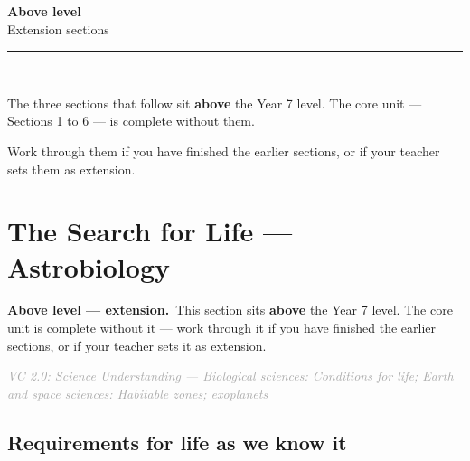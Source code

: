 \documentclass[11pt,a4paper]{article}
\newcommand{\extension}[1]{%
  \begin{extbox}
  {\headingfont\bfseries\color{Violet}Above level --- extension.}\ #1
  \end{extbox}
  \medskip
}
\newcommand{\vc}[2]{\small\textcolor{DarkGrey}{\textit{VC 2.0: #1 --- #2}}}
\begin{document}
\newpage
\vspace*{3cm}
\begin{center}
{\headingfont\Huge\bfseries\color{Violet}Above level}\\[0.4em]
{\headingfont\Large\color{Violet}Extension sections}\\[1.4em]
{\color{Violet}\rule{0.45\linewidth}{1.4pt}}\\[1.4em]
\begin{minipage}{0.72\linewidth}
\centering
The three sections that follow sit \textbf{above} the Year 7 level. The core
unit --- Sections 1 to 6 --- is complete without them.

\medskip
Work through them if you have finished the earlier sections, or if your
teacher sets them as extension.
\end{minipage}
\end{center}

\newpage
\section[The Search for Life --- Astrobiology \textnormal{(above level)}]{The Search for Life --- Astrobiology}\label{sec:8}
\extension{This section sits \textbf{above} the Year 7 level. The core unit
is complete without it --- work through it if you have finished the earlier
sections, or if your teacher sets it as extension.}
\vc{Science Understanding}{Biological sciences: Conditions for life; Earth and space sciences: Habitable zones; exoplanets}

\subsection{Requirements for life as we know it}\label{sub:8.1}
\end{document}
